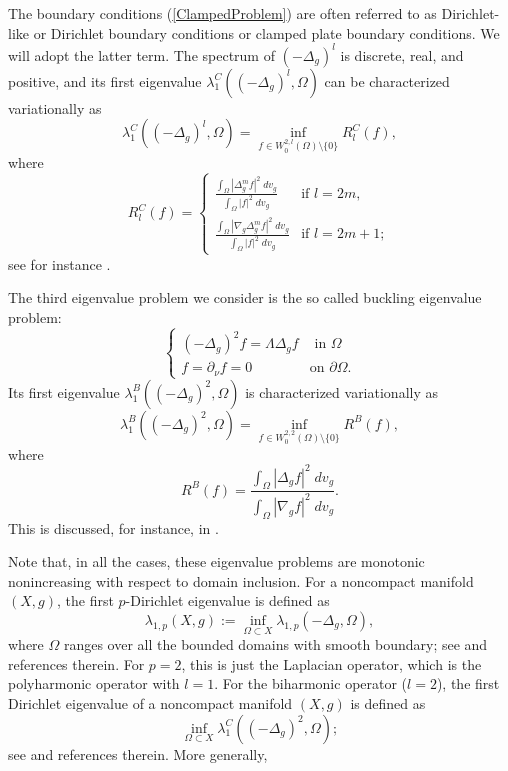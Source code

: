 \documentclass{amsart}
\begin{document}
The boundary conditions (\ref{ClampedProblem}) are often referred to as Dirichlet-like or Dirichlet boundary conditions or clamped plate boundary conditions. We will adopt the latter term. The spectrum of $(-\Delta_{g})^l$ is discrete, real, and positive, and its first eigenvalue $\lambda_1^C((-\Delta_{g})^l,\Omega)$ can be characterized variationally as
\begin{equation}\label{VariationalCharacterization}
    \lambda_1^C((-\Delta_{g})^l,\Omega) = \inf_{f\in W^{2,l}_0(\Omega)\setminus\{0\}}R^C_l(f),
\end{equation}
where 
\begin{equation}\label{Rayleigh-Quotient-C}
    R^C_l(f) = 
\begin{cases}
    \frac{\displaystyle\int_\Omega |\Delta_{g}^mf|^2\;dv_{g}}{\displaystyle\int_\Omega |f|^2\;dv_{g}} & \text{if } l=2m, \\ \frac{\displaystyle\int_\Omega |\nabla_{g}\Delta_{g}^mf|^2\;dv_{g}}{\displaystyle\int_\Omega |f|^2\;dv_{g}} & \text{if }l=2m+1;
\end{cases}
\end{equation}
see for instance \cites{ZhangLiuwei2016Tlbo, BuosoLamberti2013}.

The third eigenvalue problem we consider is the so called buckling eigenvalue problem:
\begin{equation}\label{BucklingProblem}
\begin{cases}
    (-\Delta_{g})^2f = \Lambda \Delta_{g}f & \text{ in }\Omega \\ f = \partial_\nu f =0 &\text{on }\partial \Omega.
\end{cases}
\end{equation}
Its first eigenvalue $\lambda_1^B((-\Delta_{g})^2,\Omega)$ is characterized variationally as 
\begin{equation}
    \lambda_1^B((-\Delta_{g})^2,\Omega) = \inf_{f\in W^{2,2}_0(\Omega)\setminus\{0\}} R^B(f),
\end{equation}
where 
\begin{equation}\label{Rayleigh-Quotient-B}
    R^B(f) = \frac{\displaystyle\int_\Omega |\Delta_{g}f|^2\;dv_{g}}{\displaystyle\int_\Omega |\nabla_{g}f|^2\;dv_{g}}.
\end{equation}
This is discussed, for instance, in \cite{BuosoLamberti2013}.

Note that, in all the cases, these eigenvalue problems are monotonic nonincreasing with respect to domain inclusion. For a noncompact manifold $(X,g)$, the first $p$-Dirichlet eigenvalue is defined as \[\lambda_{1,p}(X,g):=\inf_{\Omega\subset X}\lambda_{1,p}(-\Delta_{g}, \Omega),\] where $\Omega$ ranges over all the bounded domains with smooth boundary; see \cite{PerezAyalaTyrrell} and references therein. For $p=2$, this is just the Laplacian operator, which is the polyharmonic operator with $l=1$. For the biharmonic operator ($l=2$), the first Dirichlet eigenvalue of a noncompact manifold $(X,g)$ is defined as \[\inf_{\Omega\subset X}\lambda_1^C((-\Delta_{g})^2, \Omega);\] see \cites{LinHezi2025Sgef,KristalyAlexandru2020Ftoc, FarkasKajantoKristaly2025} and references therein. More generally,
\end{document}
